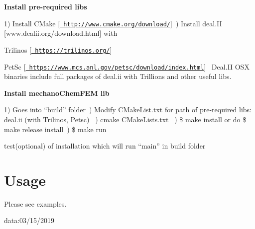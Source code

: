 \begin{DoxyEnumerate}
\item {\bfseries{Install pre-\/required libs}}~\newline


1) Install C\+Make \mbox{[}\href{http://www.cmake.org/download/}{\texttt{ http\+://www.\+cmake.\+org/download/}}\mbox{]}~) Install deal.\+II \mbox{[}www.\+dealii.\+org/download.html\mbox{]} with~\newline

\begin{DoxyItemize}
\item Trilinos \mbox{[}\href{https://trilinos.org/}{\texttt{ https\+://trilinos.\+org/}}\mbox{]}~\newline

\item Pet\+Sc \mbox{[}\href{https://www.mcs.anl.gov/petsc/download/index.html}{\texttt{ https\+://www.\+mcs.\+anl.\+gov/petsc/download/index.\+html}}\mbox{]}~\newline
 Deal.\+II O\+SX binaries include full packages of deal.\+ii with Trillions and other useful libs.
\end{DoxyItemize}
\item {\bfseries{Install mechano\+Chem\+F\+EM lib}}~\newline


1) Goes into “build” folder~) Modify C\+Make\+List.\+txt for path of pre-\/required libs\+: deal.\+ii (with Trilinos, Petsc) ~) cmake C\+Make\+Lists.\+txt ~) \$ make install or do \$ make release install~) \$ make run ~\newline

\begin{DoxyItemize}
\item test(optional) of installation which will run “main” in build folder ~\newline

\end{DoxyItemize}
\end{DoxyEnumerate}

\section*{{\bfseries{Usage}}~\newline
 }

Please see examples.

data\+:03/15/2019 